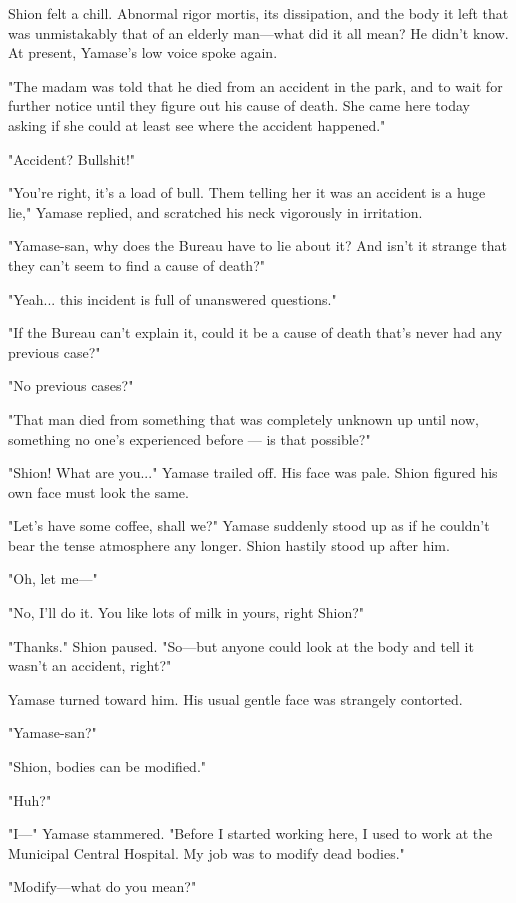 Shion felt a chill. Abnormal rigor mortis, its dissipation, and the body
it left that was unmistakably that of an elderly man---what did it all
mean? He didn't know. At present, Yamase's low voice spoke again.

"The madam was told that he died from an accident in the park, and to
wait for further notice until they figure out his cause of death. She
came here today asking if she could at least see where the accident
happened."

"Accident? Bullshit!"

"You're right, it's a load of bull. Them telling her it was an accident
is a huge lie," Yamase replied, and scratched his neck vigorously in
irritation.

"Yamase-san, why does the Bureau have to lie about it? And isn't it
strange that they can't seem to find a cause of death?"

"Yeah... this incident is full of unanswered questions."

"If the Bureau can't explain it, could it be a cause of death that's
never had any previous case?"

"No previous cases?"

"That man died from something that was completely unknown up until now,
something no one's experienced before --- is that possible?"

"Shion! What are you..." Yamase trailed off. His face was pale. Shion
figured his own face must look the same.

"Let's have some coffee, shall we?" Yamase suddenly stood up as if he
couldn't bear the tense atmosphere any longer. Shion hastily stood up
after him.

"Oh, let me---"

"No, I'll do it. You like lots of milk in yours, right Shion?"

"Thanks." Shion paused. "So---but anyone could look at the body and tell
it wasn't an accident, right?"

Yamase turned toward him. His usual gentle face was strangely contorted.

"Yamase-san?"

"Shion, bodies can be modified."

"Huh?"

"I---" Yamase stammered. "Before I started working here, I used to work at
the Municipal Central Hospital. My job was to modify dead bodies."

"Modify---what do you mean?"

